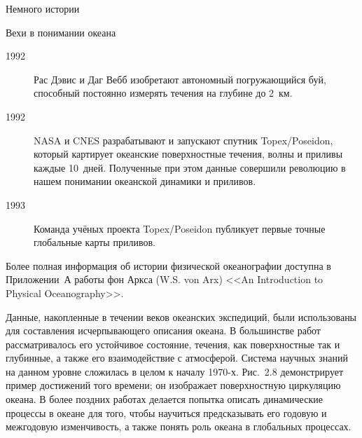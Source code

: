\begin{chapter}{Немного истории}
\begin{section}{Вехи в понимании океана}
\begin{description}
\item[1992] Рас Дэвис и Даг Вебб изобретают автономный погружающийся
буй, способный постоянно измерять течения на глубине до 2~км.
%

\item[1992] NASA и CNES разрабатывают и запускают спутник Topex/Poseidon,
который картирует океанские поверхностные течения, волны и приливы каждые 
10~дней. Полученные при этом данные совершили революцию в нашем понимании
океанской динамики и приливов.
%

\item[1993] Команда учёных проекта Topex/Poseidon публикует первые точные
глобальные карты приливов.
%
\end{description}

Более полная информация об истории физической океанографии доступна
в Приложении~А работы фон Аркса (W.S. von Arx) <<An Introduction
to Physical Oceanography>>.
%

Данные, накопленные в течении веков океанских экспедиций, были
использованы для составления исчерпывающего описания океана.
В большинстве работ рассматривалось его устойчивое состояние, 
течения, как поверхностные так и глубинные, а также его взаимодействие с
атмосферой. Система научных знаний на данном уровне сложилась в целом   
к началу 1970-х. Рис.~2.8 демонстрирует пример достижений того времени; 
он изображает поверхностную циркуляцию океана. 
В более поздних работах делается попытка описать динамические
процессы в океане для того, чтобы научиться предсказывать его годовую и
межгодовую изменчивость, а также понять роль океана в глобальных
процессах.
%
\end{section}


\end{chapter}
